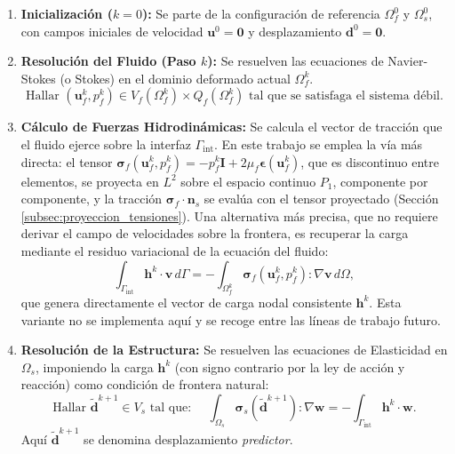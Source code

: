 \documentclass[12pt, letterpaper]{report}
\theoremstyle{definition}
\begin{document}
\begin{enumerate}
    \item \textbf{Inicialización ($k=0$):} 
    Se parte de la configuración de referencia $\Omega_f^0$ y $\Omega_s^0$, con campos iniciales de velocidad $\mathbf{u}^0 = \mathbf{0}$ y desplazamiento $\mathbf{d}^0 = \mathbf{0}$.
    
    \item \textbf{Resolución del Fluido (Paso $k$):}
    Se resuelven las ecuaciones de Navier-Stokes (o Stokes) en el dominio deformado actual $\Omega_f^k$.
    \[
    \text{Hallar } (\mathbf{u}_f^k, p_f^k) \in V_f(\Omega_f^k) \times Q_f(\Omega_f^k) \text{ tal que se satisfaga el sistema débil.}
    \]
    
    \item \textbf{Cálculo de Fuerzas Hidrodinámicas:}
    Se calcula el vector de tracción que el fluido ejerce sobre la interfaz $\Gamma_{\text{int}}$. En este trabajo se emplea la vía más directa: el tensor $\boldsymbol{\sigma}_f(\mathbf{u}_f^k, p_f^k) = -p_f^k\mathbf{I} + 2\mu_f\boldsymbol{\epsilon}(\mathbf{u}_f^k)$, que es discontinuo entre elementos, se proyecta en $L^2$ sobre el espacio continuo $P_1$, componente por componente, y la tracción $\boldsymbol{\sigma}_f \cdot \mathbf{n}_s$ se evalúa con el tensor proyectado (Sección \ref{subsec:proyeccion_tensiones}). Una alternativa más precisa, que no requiere derivar el campo de velocidades sobre la frontera, es recuperar la carga mediante el residuo variacional de la ecuación del fluido:
    \[
    \int_{\Gamma_{\text{int}}} \mathbf{h}^k \cdot \mathbf{v} \, d\Gamma = -\int_{\Omega_f^k} \boldsymbol{\sigma}_f(\mathbf{u}_f^k, p_f^k) : \nabla \mathbf{v} \, d\Omega,
    \]
    que genera directamente el vector de carga nodal consistente $\mathbf{h}^k$. Esta variante no se implementa aquí y se recoge entre las líneas de trabajo futuro.
    
    \item \textbf{Resolución de la Estructura:}
    Se resuelven las ecuaciones de Elasticidad en $\Omega_s$, imponiendo la carga $\mathbf{h}^k$ (con signo contrario por la ley de acción y reacción) como condición de frontera natural:
    \[
    \text{Hallar } \tilde{\mathbf{d}}^{k+1} \in V_s \text{ tal que: } \quad \int_{\Omega_s} \boldsymbol{\sigma}_s(\tilde{\mathbf{d}}^{k+1}) : \nabla \mathbf{w} = -\int_{\Gamma_{\text{int}}} \mathbf{h}^k \cdot \mathbf{w}.
    \]
    Aquí $\tilde{\mathbf{d}}^{k+1}$ se denomina desplazamiento \emph{predictor}.
    

\end{enumerate}
\end{document}
